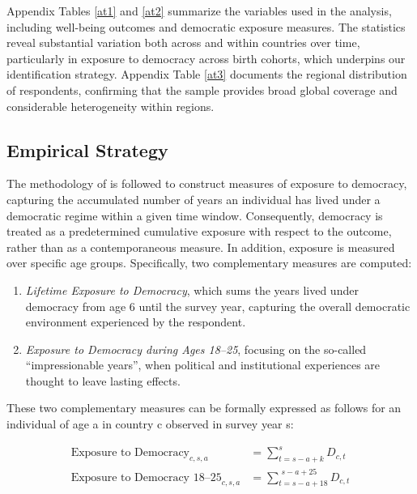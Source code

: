 \documentclass[11pt]{article}
\newcommand{\bbb}[1]{\cTwo{#1}} %
\begin{document}
Appendix Tables \ref{at1} and \ref{at2} summarize the variables used in the analysis, including well-being outcomes and democratic exposure measures. The statistics reveal substantial variation both across and within countries over time, particularly in exposure to democracy across birth cohorts, which underpins our identification strategy. Appendix Table \ref{at3} documents the regional distribution of respondents, confirming that the sample provides broad global coverage and considerable heterogeneity within regions. 


\vspace*{0.5cm}
\subsection{Empirical Strategy}\label{EmpiricalStrategy}

The methodology of \bbb{Acemoglu2024} is followed to construct measures of exposure to democracy, capturing the accumulated number of years an individual has lived under a democratic regime within a given time window. Consequently, democracy is treated as a predetermined cumulative exposure with respect to the outcome, rather than as a contemporaneous measure. In addition, exposure is measured over specific age groups. Specifically, two complementary measures are computed:

\begin{enumerate}
	\item \textit{Lifetime Exposure to Democracy}, which sums the years lived under democracy from age 6 until the survey year, capturing the overall democratic environment experienced by the respondent.
	
	\item \textit{Exposure to Democracy during Ages 18--25}, focusing on the so-called “impressionable years”, when political and institutional experiences are thought to leave lasting effects. 
\end{enumerate}

These two complementary measures can be formally expressed as follows for an individual of age a in country c observed in survey year s:

\begin{equation}
	\label{1}
	\begin{aligned}
		\text{Exposure to Democracy}_{c,s,a} 
		&= \sum_{t=s-a+k}^{s} D_{c,t} \\[1em]
		\text{Exposure to Democracy 18--25}_{c,s,a} 
		&= \sum_{t = s-a+18}^{\,\,s-a+25} D_{c,t}
	\end{aligned}
\end{equation}
\end{document}
